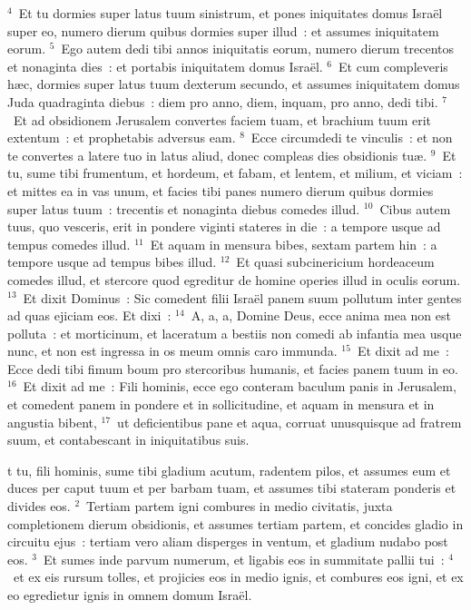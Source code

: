 ${}^{4}$~Et tu dormies super latus tuum sinistrum, et pones iniquitates domus Isra\"el super eo, numero dierum quibus dormies super illud~: et assumes iniquitatem eorum.
${}^{5}$~Ego autem dedi tibi annos iniquitatis eorum, numero dierum trecentos et nonaginta dies~: et portabis iniquitatem domus Isra\"el.
${}^{6}$~Et cum compleveris h\ae c, dormies super latus tuum dexterum secundo, et assumes iniquitatem domus Juda quadraginta diebus~: diem pro anno, diem, inquam, pro anno, dedi tibi.
${}^{7}$~Et ad obsidionem Jerusalem convertes faciem tuam, et brachium tuum erit extentum~: et prophetabis adversus eam.
${}^{8}$~Ecce circumdedi te vinculis~: et non te convertes a latere tuo in latus aliud, donec compleas dies obsidionis tu\ae .
${}^{9}$~Et tu, sume tibi frumentum, et hordeum, et fabam, et lentem, et milium, et viciam~: et mittes ea in vas unum, et facies tibi panes numero dierum quibus dormies super latus tuum~: trecentis et nonaginta diebus comedes illud.
${}^{10}$~Cibus autem tuus, quo vesceris, erit in pondere viginti stateres in die~: a tempore usque ad tempus comedes illud.
${}^{11}$~Et aquam in mensura bibes, sextam partem hin~: a tempore usque ad tempus bibes illud.
${}^{12}$~Et quasi subcinericium hordeaceum comedes illud, et stercore quod egreditur de homine operies illud in oculis eorum.
${}^{13}$~Et dixit Dominus~: Sic comedent filii Isra\"el panem suum pollutum inter gentes ad quas ejiciam eos. Et dixi~:
${}^{14}$~A, a, a, Domine Deus, ecce anima mea non est polluta~: et morticinum, et laceratum a bestiis non comedi ab infantia mea usque nunc, et non est ingressa in os meum omnis caro immunda.
${}^{15}$~Et dixit ad me~: Ecce dedi tibi fimum boum pro stercoribus humanis, et facies panem tuum in eo.
${}^{16}$~Et dixit ad me~: Fili hominis, ecce ego conteram baculum panis in Jerusalem, et comedent panem in pondere et in sollicitudine, et aquam in mensura et in angustia bibent,
${}^{17}$~ut deficientibus pane et aqua, corruat unusquisque ad fratrem suum, et contabescant in iniquitatibus suis.

\bchapter
{}t tu, fili hominis, sume tibi gladium acutum, radentem pilos, et assumes eum et duces per caput tuum et per barbam tuam, et assumes tibi stateram ponderis et divides eos.
${}^{2}$~Tertiam partem igni combures in medio civitatis, juxta completionem dierum obsidionis, et assumes tertiam partem, et concides gladio in circuitu ejus~: tertiam vero aliam disperges in ventum, et gladium nudabo post eos.
${}^{3}$~Et sumes inde parvum numerum, et ligabis eos in summitate pallii tui~:
${}^{4}$~et ex eis rursum tolles, et projicies eos in medio ignis, et combures eos igni, et ex eo egredietur ignis in omnem domum Isra\"el.


